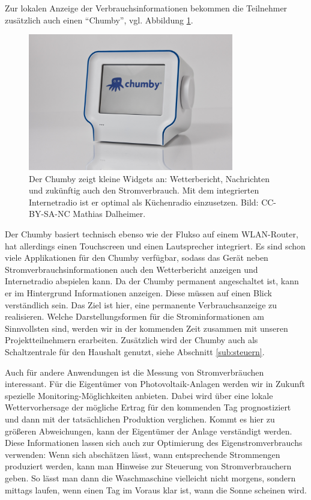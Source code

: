 \documentclass[logo]{fhgart}
\newcommand*\imgwidth{0.8\textwidth}
\begin{document}
Zur lokalen Anzeige der Verbrauchsinformationen bekommen die Teilnehmer
zusätzlich auch einen "`Chumby"', vgl. Abbildung \ref{fig:chumby}. 
\begin{figure}[htbp]
  \begin{center}
    \includegraphics[width=\imgwidth]{figures/chumby.jpg}
    \caption{Der Chumby zeigt kleine Widgets an: Wetterbericht,
    Nachrichten und zukünftig auch den Stromverbrauch. Mit dem
    integrierten Internetradio ist er optimal als Küchenradio
    einzusetzen. Bild: CC-BY-SA-NC Mathias Dalheimer.}
    \label{fig:chumby}
  \end{center}
\end{figure}
Der Chumby basiert technisch ebenso wie der Flukso auf einem
WLAN-Router, hat allerdings einen Touchscreen und einen Lautsprecher
integriert. Es sind schon viele Applikationen für den Chumby verfügbar,
sodass das Gerät neben Stromverbrauchsinformationen auch den
Wetterbericht anzeigen und Internetradio abspielen kann. Da der Chumby
permanent angeschaltet ist, kann er im Hintergrund Informationen
anzeigen. Diese müssen auf einen Blick verständlich sein. Das Ziel ist
hier, eine permanente Verbrauchsanzeige zu realisieren.  Welche
Darstellungsformen für die Strominformationen am Sinnvollsten sind,
werden wir in der kommenden Zeit zusammen mit unseren Projektteilnehmern
erarbeiten. Zusätzlich wird der Chumby auch als Schaltzentrale für den
Haushalt genutzt, siehe Abschnitt \ref{sub:steuern}.

Auch für andere Anwendungen ist die Messung von Stromverbräuchen
interessant. Für die Eigentümer von Photovoltaik-Anlagen werden wir in
Zukunft spezielle Monitoring-Möglichkeiten anbieten. Dabei wird über
eine lokale Wettervorhersage der mögliche Ertrag für den kommenden Tag
prognostiziert und dann mit der tatsächlichen Produktion verglichen.
Kommt es hier zu größeren Abweichungen, kann der Eigentümer der Anlage
verständigt werden. Diese Informationen lassen sich auch zur Optimierung
des Eigenstromverbrauchs verwenden: Wenn sich abschätzen lässt, wann
entsprechende Strommengen produziert werden, kann man Hinweise zur
Steuerung von Stromverbrauchern geben. So lässt man dann die
Waschmaschine vielleicht nicht morgens, sondern mittags laufen, wenn
einen Tag im Voraus klar ist, wann die Sonne scheinen wird.
\end{document}
